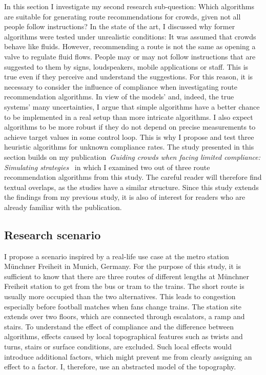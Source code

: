 In this section I investigate my second research sub-question: Which algorithms are suitable for generating route recommendations for crowds, given not all people follow instructions?
In the state of the art, I  discussed why former algorithms were tested under unrealistic conditions: It was assumed that crowds behave like fluids. However, recommending a route is not the same as opening a valve to regulate fluid flows. People may or may not follow instructions that are suggested to them by signs, loudspeakers, mobile applications or staff. This is true even if they perceive and understand the suggestions. For this reason, it is necessary to consider the influence of compliance when investigating route recommendation algorithms. In view of the models’ and, indeed, the true systems’ many uncertainties, I argue that simple algorithms have a better chance to be implemented in a real setup than more intricate algorithms. I also expect algorithms to be more robust if they do not depend on precise measurements to achieve target values in some control loop. This is why I propose and test three heuristic algorithms for unknown compliance rates. The study presented in this section builds on my publication~\textit{Guiding crowds when facing limited compliance: Simulating strategies}~\cite{mayr-2022-cdyn}
in which I examined two out of three route recommendation algorithms from this study. The careful reader will therefore find textual overlaps, as the studies have a similar structure. Since this study extends the findings from my previous study, it is also of interest for readers who are already familiar with the publication.



\subsection{Research scenario}

I propose a scenario inspired by a real-life use case at the metro station Münchner Freiheit in Munich, Germany. For the purpose of this study, it is sufficient to know that there are three routes of different lengths at Münchner Freiheit station to get from the bus or tram to the trains. The short route is usually more occupied than the two alternatives. This leads to congestion especially before football matches when fans change trains. The station site extends over two floors, which are connected through escalators, a ramp and stairs. 
To understand the effect of compliance and the difference between algorithms, effects caused by local topographical features such as  twists and turns, stairs or surface conditions, are excluded. Such local effects would introduce additional factors, which might prevent me from clearly assigning an effect to a factor. I, therefore, use an abstracted model of the topography.

